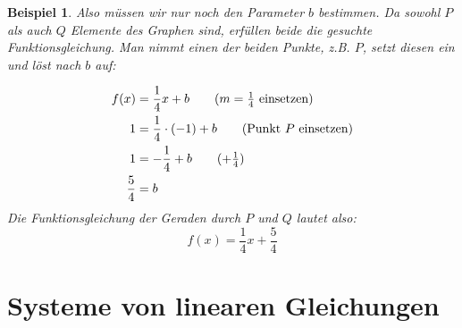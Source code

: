 \documentclass[%
11pt,%
twoside,%
titlepage,%
swissgerman,%
headsepline%
]{scrartcl}
\theoremstyle{definition}
\newtheorem{bsp}{Beispiel}[subsection] %
\theoremstyle{plain}
\newtheorem{bsp}{Beispiel}[subsection] %
\theoremstyle{plain}
\begin{document}
\begin{bsp}
		Also müssen wir nur noch den Parameter $b$ bestimmen. Da sowohl $P$ als auch $Q$ Elemente des Graphen sind, erfüllen beide die gesuchte Funktionsgleichung. Man nimmt einen der beiden Punkte, z.B. $P$, setzt diesen ein und löst nach $b$ auf:
		
		\begin{align}
			f(x)&=\frac{1}{4}x+b\tag{$m=\frac{1}{4}$ einsetzen}\\
			1&=\frac{1}{4}\cdot(-1)+b\tag{Punkt $P$ einsetzen}\\
			1&=-\frac{1}{4}+b\tag{$+\frac{1}{4}$}\\
			\frac{5}{4}&=b\notag
		\end{align}
		Die Funktionsgleichung der Geraden durch $P$ und $Q$ lautet also:
		$$f(x)=\frac{1}{4}x+\frac{5}{4}$$
	\end{bsp}
	
	\section{Systeme von linearen Gleichungen}
	
\end{document}
